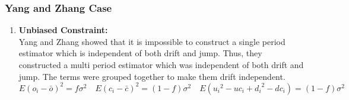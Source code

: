 \documentclass[12pt]{article}   	%
\begin{document}
\subsubsection{Yang and Zhang Case}

\begin{enumerate}
\item \textbf{Unbiased Constraint:}\\
Yang and Zhang showed that it is impossible to construct a single period estimator which is independent of both drift and jump\cite{yang2000}. Thus, they constructed a multi period estimator which was independent of both drift and jump. The terms were grouped together to make them drift independent.
$$ E(o_i-\bar{o})^2 =f\sigma^2\quad  E(c_i-\bar{c})^2 =(1-f)\sigma^2\quad 
E({u_i}^2-uc_i+{d_i}^2-dc_i)=(1-f)\sigma^2$$


\end{enumerate}
\end{document}
